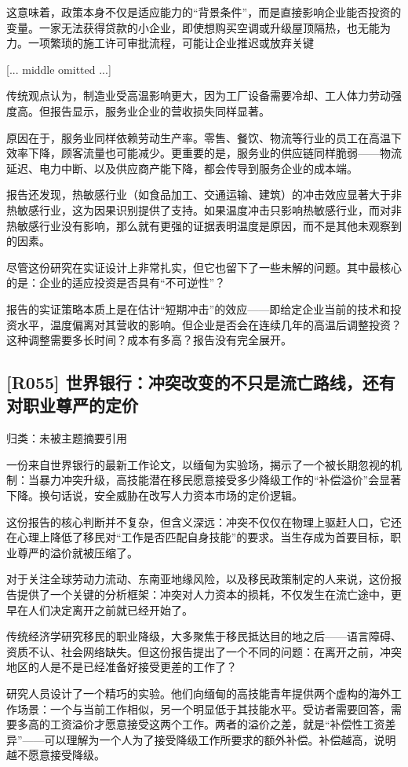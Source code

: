 \documentclass[11pt]{ctexart}
\begin{document}
这意味着，政策本身不仅是适应能力的“背景条件”，而是直接影响企业能否投资的变量。一家无法获得贷款的小企业，即使想购买空调或升级屋顶隔热，也无能为力。一项繁琐的施工许可审批流程，可能让企业推迟或放弃关键

[... middle omitted ...]

传统观点认为，制造业受高温影响更大，因为工厂设备需要冷却、工人体力劳动强度高。但报告显示，服务业企业的营收损失同样显著。

原因在于，服务业同样依赖劳动生产率。零售、餐饮、物流等行业的员工在高温下效率下降，顾客流量也可能减少。更重要的是，服务业的供应链同样脆弱——物流延迟、电力中断、以及供应商产能下降，都会传导到服务企业的成本端。

报告还发现，热敏感行业（如食品加工、交通运输、建筑）的冲击效应显著大于非热敏感行业，这为因果识别提供了支持。如果温度冲击只影响热敏感行业，而对非热敏感行业没有影响，那么就有更强的证据表明温度是原因，而不是其他未观察到的因素。

尽管这份研究在实证设计上非常扎实，但它也留下了一些未解的问题。其中最核心的是：企业的适应投资是否具有“不可逆性”？

报告的实证策略本质上是在估计“短期冲击”的效应——即给定企业当前的技术和投资水平，温度偏离对其营收的影响。但企业是否会在连续几年的高温后调整投资？这种调整需要多长时间？成本有多高？报告没有完全展开。

\subsection{[R055] 世界银行：冲突改变的不只是流亡路线，还有对职业尊严的定价}
{\small\color{refgray}归类：未被主题摘要引用}

一份来自世界银行的最新工作论文，以缅甸为实验场，揭示了一个被长期忽视的机制：当暴力冲突升级，高技能潜在移民愿意接受多少降级工作的“补偿溢价”会显著下降。换句话说，安全威胁在改写人力资本市场的定价逻辑。

这份报告的核心判断并不复杂，但含义深远：冲突不仅仅在物理上驱赶人口，它还在心理上降低了移民对“工作是否匹配自身技能”的要求。当生存成为首要目标，职业尊严的溢价就被压缩了。

对于关注全球劳动力流动、东南亚地缘风险，以及移民政策制定的人来说，这份报告提供了一个关键的分析框架：冲突对人力资本的损耗，不仅发生在流亡途中，更早在人们决定离开之前就已经开始了。

传统经济学研究移民的职业降级，大多聚焦于移民抵达目的地之后——语言障碍、资质不认、社会网络缺失。但这份报告提出了一个不同的问题：在离开之前，冲突地区的人是不是已经准备好接受更差的工作了？

研究人员设计了一个精巧的实验。他们向缅甸的高技能青年提供两个虚构的海外工作场景：一个与当前工作相似，另一个明显低于其技能水平。受访者需要回答，需要多高的工资溢价才愿意接受这两个工作。两者的溢价之差，就是“补偿性工资差异”——可以理解为一个人为了接受降级工作所要求的额外补偿。补偿越高，说明越不愿意接受降级。
\end{document}
